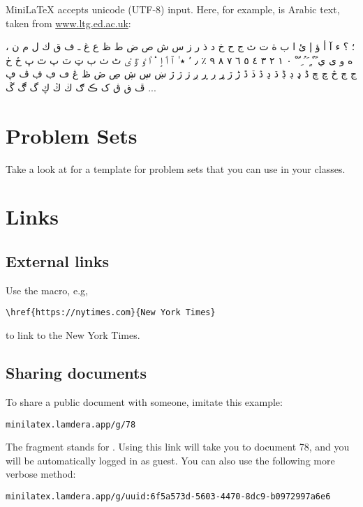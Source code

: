 MiniLaTeX accepts unicode (UTF-8) input.  Here, for example, is Arabic text,  taken from \href{https://www.ltg.ed.ac.uk/~richard/unicode-sample.html}{www.ltg.ed.ac.uk}:

، ؛ ؟ ء آ أ ؤ إ ئ ا ب ة ت ث ج ح خ د ذ ر ز س ش ص ض ط ظ ع غ ـ ف ق ك ل م ن ه و ى ي ً ٌ ٍ َ ُ ِ ّ ْ ٠ ١ ٢ ٣ ٤ ٥ ٦ ٧ ٨ ٩ ٪ ٫ ٬ ٭ ٰ ٱ ٲ ٳ ٴ ٵ ٶ ٷ ٸ ٹ ٺ ٻ ټ ٽ پ ٿ ڀ ځ ڂ ڃ ڄ څ چ ڇ ڈ ډ ڊ ڋ ڌ ڍ ڎ ڏ ڐ ڑ ڒ ړ ڔ ڕ ږ ڗ ژ ڙ ښ ڛ ڜ ڝ ڞ ڟ ڠ ڡ ڢ ڣ ڤ ڥ ڦ ڧ ڨ ک ڪ ګ ڬ ڭ ڮ گ ڰ ڱ ...


\section{Problem Sets}

Take a look at  for a template for problem sets that you can use in your classes.

\section{Links}

\subsection{External links}

Use the  macro, e.g,

\begin{verbatim}
\href{https://nytimes.com}{New York Times}
\end{verbatim}

to link to the New York Times.

\subsection{Sharing documents}

To share a public document with someone, imitate this example:

\begin{verbatim}
minilatex.lamdera.app/g/78
\end{verbatim}

The  fragment  stands for .  Using this link will take you to document 78, and you will be automatically logged in as guest.  You can also use the following more verbose method:

\begin{verbatim}
minilatex.lamdera.app/g/uuid:6f5a573d-5603-4470-8dc9-b0972997a6e6
\end{verbatim}

